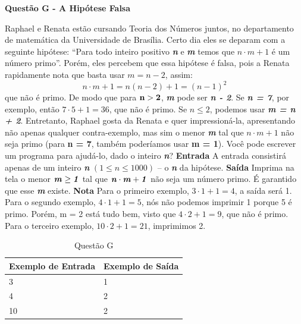 \documentclass[a4paper, 12pt]{article}
\begin{document}
\newpage %
\begin{center}
\textbf{{\Large Questão G - A Hipótese Falsa}}
\end{center}
\vspace{5pt}
Raphael e Renata estão cursando Teoria dos Números juntos, no departamento de matemática da Universidade de Brasília. Certo dia eles se deparam com a seguinte hipótese: ``Para todo inteiro positivo \textbf{\textit{n}} e \textbf{\textit{m}} temos que $n\cdot m + 1$ é um número primo''. Porém, eles percebem que essa hipótese é falsa, pois a Renata rapidamente nota que basta usar $m = n - 2$, assim:
$$n\cdot m + 1 = n(n - 2) + 1 = {(n - 1)}^2 $$ que não é primo. \newline \newline
De modo que para $\textrm{\textbf{n}} > \textrm{\textbf{2}}$, \textbf{\textit{m}} pode ser \textbf{\textit{n - 2}}. Se \textbf{\textit{n = 7}}, por exemplo, então $7\cdot 5 + 1 = 36$, que não é primo. Se $n \leq 2$, podemos usar \textbf{\textit{m = n + 2}}.
Entretanto, Raphael gosta da Renata e quer impressioná-la, apresentando não apenas qualquer contra-exemplo, mas sim o menor \textbf{\textit{m}} tal que $n\cdot m + 1$ não seja primo (para \textbf{n = 7}, também poderíamos usar \textbf{m = 1}). \newline \newline
Você pode escrever um programa para ajudá-lo, dado o inteiro \textbf{\textit{n}}?
\newline \newline
\textbf{{\large Entrada}} \newline
A entrada consistirá apenas de um inteiro \textbf{\textit{n}} $(1 \leq n \leq 1000)$ – o \textbf{\textit{n}} da hipótese.
\newline \newline
\textbf{{\large Saída}} \newline
Imprima na tela o menor $\textrm{\textbf{\textit{m}}} \geq \textrm{\textbf{\textit{1}}}$ tal que 
$\textrm{\textbf{\textit{n}}}\cdot \textrm{\textbf{\textit{m}}} + \textrm{\textbf{\textit{1}}}$ não seja um número primo. É garantido que esse \textbf{\textit{m}} existe.
\newline \newline
\textbf{{\large Nota}} \newline
Para o primeiro exemplo, $3\cdot 1 + 1 = 4$, a saída será 1. \newline
Para o segundo exemplo, $4\cdot 1 + 1 = 5$, nós não podemos imprimir 1 porque 5 é primo. Porém, m = 2 está tudo bem, visto que $4\cdot 2 + 1 = 9$, que não é primo. \newline
Para o terceiro exemplo, $10\cdot 2 + 1 = 21$, imprimimos 2.
\newline
\begin{table}[H]
	\centering
	\begin{tabular}{|l|l|}
	\hline
	\textbf{Exemplo de Entrada} & \textbf{Exemplo de Saída} \\ \hline
	3 & 1 \\ \hline
	4 & 2 \\ \hline
	10 & 2 \\ \hline
	\end{tabular}
	\caption{Questão G}
	\label{tabela7}
\end{table}
\end{document}
